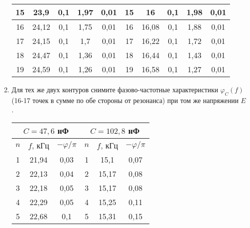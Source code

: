 \documentclass[a4paper,12pt]{extreport}
\begin{document}
\begin{enumerate}
\begin{table}[h]
\begin{tabular}{ccccc||c|c|c|c|c|}
\multicolumn{1}{|c|}{15}  & \multicolumn{1}{c|}{23,9}     & \multicolumn{1}{c|}{0,1}             & \multicolumn{1}{c|}{1,97}   & 0,01                  & 15  & 16   & 0,1             & 1,98 & 0,01          \\ \hline
\multicolumn{1}{|c|}{16}  & \multicolumn{1}{c|}{24,12}     & \multicolumn{1}{c|}{0,1}             & \multicolumn{1}{c|}{1,75}   & 0,01                  & 16  & 16,08   & 0,1             & 1,88 & 0,01          \\ \hline
\multicolumn{1}{|c|}{17}  & \multicolumn{1}{c|}{24,15}     & \multicolumn{1}{c|}{0,1}             & \multicolumn{1}{c|}{1,7}   & 0,01                  & 17  & 16,22   & 0,1             & 1,72 & 0,01          \\ \hline
\multicolumn{1}{|c|}{18}  & \multicolumn{1}{c|}{24,47}     & \multicolumn{1}{c|}{0,1}             & \multicolumn{1}{c|}{1,36}   & 0,01                  & 18  & 16,44   & 0,1             & 1,43 & 0,01          \\ \hline
\multicolumn{1}{|c|}{19}  & \multicolumn{1}{c|}{24,59}     & \multicolumn{1}{c|}{0,1}             & \multicolumn{1}{c|}{1,26}   & 0,01                  & 19  & 16,58   & 0,1             & 1,27 & 0,01          \\ \hline
\end{tabular}
\end{table}
\newpage
\item Для тех же двух контуров снимите фазово-частотные характеристики $\varphi_C(f)$ (16-17 точек в сумме по обе стороны от резонанса) при том же
напряжении $E$.
\begin{table}[h]
\centering
\begin{tabular}{ccc||c|c|c|}
\hline
\multicolumn{3}{|c||}{$C = 47,6 $ нФ} & \multicolumn{3}{c|}{$C = 102,8$ нФ} \\ \hline
\multicolumn{1}{|c|}{$n$} & \multicolumn{1}{c|}{$f$, кГц} & $-\varphi/ \pi$ & $n$ & $f$, кГц & $-\varphi/ \pi$ \\ \hline
\multicolumn{1}{|c|}{1} & \multicolumn{1}{c|}{21,94} & 0,03 & 1 & 15,1 & 0,07 \\ \hline
\multicolumn{1}{|c|}{2} & \multicolumn{1}{c|}{22,13} & 0,04 & 2 & 15,17 & 0,08 \\ \hline
\multicolumn{1}{|c|}{3} & \multicolumn{1}{c|}{22,18} & 0,05 & 3 & 15,17 & 0,08 \\ \hline
\multicolumn{1}{|c|}{4} & \multicolumn{1}{c|}{22,29} & 0,05 & 4 & 15,25 & 0,11 \\ \hline
\multicolumn{1}{|c|}{5} & \multicolumn{1}{c|}{22,68} & 0,1 & 5 & 15,31 & 0,15 \\ \hline

\end{tabular}
\end{table}
\end{enumerate}
\end{document}
